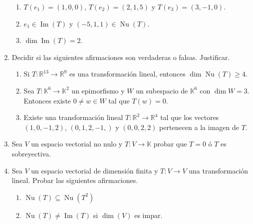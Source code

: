 \begin{enumerate}[topsep=6pt, itemsep=.4cm]
\begin{enumerate}[ topsep=5pt,itemsep=5pt]
        \item\label{usar Txyz} $T(e_1)=(1,0,0)$, $T(e_2)=(2,1,5)$ y $T(e_3)=(3,-1,0)$.
        
        \item\label{usar-1 e} $e_1\in\operatorname{Im}(T)$ y $(-5,1,1)\in\operatorname{Nu}(T)$.
        
        \item\label{usar-1 f} $\operatorname{dim} \operatorname{Im}(T)=2$.
    \end{enumerate}
        
    \rta 


    \item Decidir si las siguientes afirmaciones son verdaderas o falsas. Justificar.
    \begin{enumerate}
        \item\label{tl-VoF-a} Si $T : \mathbb R^{13} \to \mathbb R^9$ es una transformación lineal, entonces $\dim \operatorname{Nu}(T) \geq  4$.
        \item\label{tl-VoF-b} Sea $T:\mathbb{K}^{6}\longrightarrow\mathbb{K}^2$ un epimorfismo y $W$ un subespacio de $\mathbb{K}^{6}$ con $\dim W=3$. Entonces existe $0\neq w\in W$ tal que $T(w)=0$.
        \item\label{tl-VoF-c} Existe una transformación lineal $T : \mathbb R^2 \to \mathbb R^4$ tal que los vectores $(1, 0, -1, 2)$, $(0, 1, 2,-1,)$ y $(0, 0, 2, 2)$ pertenecen a la imagen de $T$.
    \end{enumerate}
    
    \rta



    \item \label{funcionales} Sea $V$ un espacio vectorial no nulo y $T:V\longrightarrow\mathbb{K}$ probar que $T=0$ ó $T$ es sobreyectiva.
    
    \rta


    \item Sea $V$ un espacio vectorial de dimensión finita y $T:V\longrightarrow V$ una transformación lineal. Probar las siguientes afirmaciones.
        \begin{multicols}{2}
            \begin{enumerate}
                \item $\operatorname{Nu}(T)\subseteq\operatorname{Nu}(T^2)$
                \item\label{dimV impar} $\operatorname{Nu}(T)\neq\operatorname{Im}(T)$ si $\dim(V)$ es impar.
            \end{enumerate}
        \end{multicols}
    
    \rta
        
    \end{enumerate}